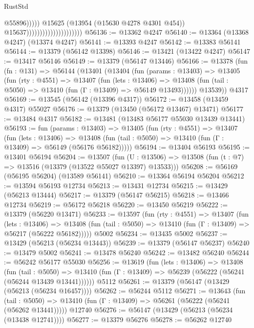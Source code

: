 \begin{lexlean}{RustStd}
\begin{coremodule}
                                                        @55896)))))
                                              @15625
                                              (@13954 (@15630 @4278 @4301 @454))
                                              @15637)))))))))))))))))))))
@56136 := @13362 @4247
@56140 := @13364 (@13368 @4247) (@13374 @4247)
@56141 := @13393 @4247
@56142 := @13383 @56141
@56144 := @13379 (@56142 @13398)
@56146 := @13421 (@13422 @4247)
@56147 := @13417 @56146
@56149 := @13379 (@56147 @13446)
@56166 := @13378
    (fun (fn : @131) =>
    @56144
      (@13401
        (@13404
          (fun (params : @13403) =>
          @13405
            (fun (rty : @4551) =>
            @13407
              (fun (lets : @13406) =>
              @13408 (fun (tail : @5050) => @13410 (fun (Γ : @13409) => @56149 @13493))))))
        @13539))
    @4317
@56169 := @13545 (@56142 (@13396 @4317))
@56172 := @13458 (@13459 @4317) @55027
@56176 := @13379 (@13450 (@56172 @13467) @13471)
@56177 := @13484 @4317
@56182 := @13481 (@13483 @56177 @55030 @13439 @13441)
@56193 := fun (params : @13403) =>
  @13405
    (fun (rty : @4551) =>
    @13407
      (fun (lets : @13406) =>
      @13408 (fun (tail : @5050) => @13410 (fun (Γ : @13409) => @56149 (@56176 @56182)))))
@56194 := @13404 @56193
@56195 := @13401 @56194
@56204 := @13507
    (fun (U : @13506) => @13508 (fun (t : @7) => @13516 (@13379 (@13522 @55027 @13397) @13533)))
@56208 := @56169 (@56195 @56204) (@13589 @56141)
@56210 := @13364 @56194 @56204
@56212 := @13594 @56193 @12734
@56213 := @13431 @12734
@56215 := @13429 (@56213 @13444)
@56217 := @13379 (@56147 @56215)
@56218 := @13466 @12734
@56219 := @56172 @56218
@56220 := @13450 @56219
@56222 := @13379 (@56220 @13471)
@56233 := @13597
    (fun (rty : @4551) =>
    @13407
      (fun (lets : @13406) =>
      @13408 (fun (tail : @5050) => @13410 (fun (Γ : @13409) => @56217 (@56222 @56182)))))
    @5002
@56234 := @13435 @5002
@56237 := @13429 (@56213 (@56234 @13443))
@56239 := @13379 (@56147 @56237)
@56240 := @13479 @5002
@56241 := @13478 @56240
@56242 := @13482 @56240
@56244 := @56242 @56177 @55030
@56256 := @13619
    (fun (lets : @13406) =>
    @13408
      (fun (tail : @5050) =>
      @13410 (fun (Γ : @13409) => @56239 (@56222 (@56241 (@56244 @13439 @13441))))))
    @5112
@56261 := @13379 (@56147 (@13429 (@56213 (@56234 @16457))))
@56262 := @56244 @5112
@56271 := @13643
    (fun (tail : @5050) => @13410 (fun (Γ : @13409) => @56261 (@56222 (@56241 (@56262 @13441)))))
    @12740
@56276 := @56147 (@13429 (@56213 (@56234 (@13438 @12741))))
@56277 := @13379 @56276
@56278 := @56262 @12740

\end{coremodule}
\end{lexlean}
